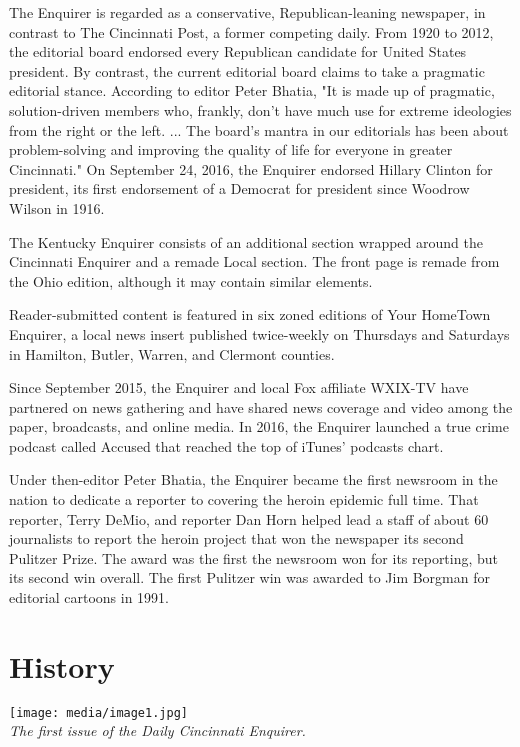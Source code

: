 The Enquirer is regarded as a conservative, Republican-leaning
newspaper, in contrast to The Cincinnati Post, a former competing daily.
From 1920 to 2012, the editorial board endorsed every Republican
candidate for United States president. By contrast, the current
editorial board claims to take a pragmatic editorial stance. According
to editor Peter Bhatia, "It is made up of pragmatic, solution-driven
members who, frankly, don't have much use for extreme ideologies from
the right or the left. ... The board's mantra in our editorials has been
about problem-solving and improving the quality of life for everyone in
greater Cincinnati." On September 24, 2016, the Enquirer endorsed
Hillary Clinton for president, its first endorsement of a Democrat for
president since Woodrow Wilson in 1916.

The Kentucky Enquirer consists of an additional section wrapped around
the Cincinnati Enquirer and a remade Local section. The front page is
remade from the Ohio edition, although it may contain similar elements.

Reader-submitted content is featured in six zoned editions of Your
HomeTown Enquirer, a local news insert published twice-weekly on
Thursdays and Saturdays in Hamilton, Butler, Warren, and Clermont
counties.

Since September 2015, the Enquirer and local Fox affiliate WXIX-TV have
partnered on news gathering and have shared news coverage and video
among the paper, broadcasts, and online media. In 2016, the Enquirer
launched a true crime podcast called Accused that reached the top of
iTunes' podcasts chart.

Under then-editor Peter Bhatia, the Enquirer became the first newsroom
in the nation to dedicate a reporter to covering the heroin epidemic
full time. That reporter, Terry DeMio, and reporter Dan Horn helped lead
a staff of about 60 journalists to report the heroin project that won
the newspaper its second Pulitzer Prize. The award was the first the
newsroom won for its reporting, but its second win overall. The first
Pulitzer win was awarded to Jim Borgman for editorial cartoons in 1991.

\section{History}\label{history}

\texttt{[image: media/image1.jpg]}\\
\emph{The first issue of the Daily Cincinnati Enquirer.}

